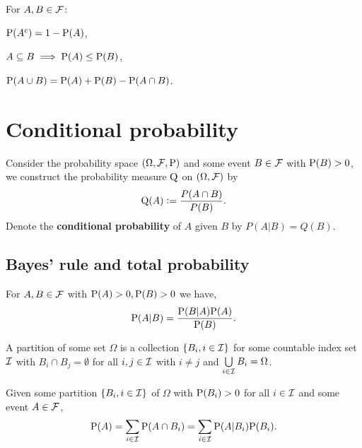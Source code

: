 \begin{corollary} For $A,B \in \FFF$: \newline
    \begin{enumerate*}
        \item $\P(A^c) = 1 - \P(A)$, \hspace{25pt}
        \item $A \subseteq B \implies \P(A) \leq \P(B)$, \hspace{25pt}
        \item $\P(A\cup B) = \P(A) + \P(B) - \P(A\cap B)$.
    \end{enumerate*}
\end{corollary}

\section{Conditional probability}
\begin{definition}
    Consider the probability space $(\Omega, \FFF, \P)$ and some event $B \in \FFF$ with $\P(B) > 0$, we construct the probability measure $\Q$ on $(\Omega, \FFF)$ by \[
        \Q(A):=\frac{P(A\cap B)}{P(B)}\textcolor{black}{.}
    \]
    Denote the \textbf{conditional probability} of $A$ given $B$ by $P(A|B) = Q(B)$.
\end{definition}

\subsection{Bayes' rule and total probability}

\begingroup\belowdisplayskip=-10pt
\begin{theorem}
    For $A,B \in \FFF$ with $\P(A) >0, \P(B) > 0$ we have, \[
        \P(A|B) = \frac{\P(B|A)\P(A)}{\P(B)}
        \textcolor{black}{.}
        \]
\end{theorem}
\endgroup

\begin{definition}
    A partition of some set $\Omega$ is a collection $\{B_i, i \in \III\}$ for some countable index set $\III$ with $B_i \cap B_j = \emptyset$ for all $i,j\in\III$ with $i\neq j$ and $\bigcup\limits_{i\in\III}B_i = \Omega$.
\end{definition}

\begingroup\belowdisplayskip=-10pt
\begin{theorem}
    Given some partition $\{B_i, i\in\III\}$ of $\Omega$ with $\P(B_i)>0$ for all $i\in\III$ and some event $A\in\FFF$,\[
        \P(A)=\sum_{i\in\III}\P(A\cap B_i)=\sum_{i\in\III}\P(A|B_i)\P(B_i)\textcolor{black}{.}
    \]
\end{theorem}
\endgroup

